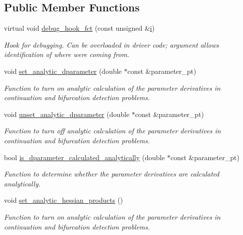 \subsection*{Public Member Functions}
\begin{DoxyCompactItemize}
\item 
virtual void \hyperlink{classoomph_1_1Problem_a36c95c8211cc02558118288888aab5e1}{debug\+\_\+hook\+\_\+fct} (const unsigned \&\hyperlink{cfortran_8h_adb50e893b86b3e55e751a42eab3cba82}{i})
\begin{DoxyCompactList}\small\item\em Hook for debugging. Can be overloaded in driver code; argument allows identification of where we\textquotesingle{}re coming from. \end{DoxyCompactList}\item 
void \hyperlink{classoomph_1_1Problem_aecef49e98bbcede9b8c3137592c2cc5a}{set\+\_\+analytic\+\_\+dparameter} (double $\ast$const \&parameter\+\_\+pt)
\begin{DoxyCompactList}\small\item\em Function to turn on analytic calculation of the parameter derivatives in continuation and bifurcation detection problems. \end{DoxyCompactList}\item 
void \hyperlink{classoomph_1_1Problem_aff7bcab5505ba482a8c9ba7bace68bc0}{unset\+\_\+analytic\+\_\+dparameter} (double $\ast$const \&parameter\+\_\+pt)
\begin{DoxyCompactList}\small\item\em Function to turn off analytic calculation of the parameter derivatives in continuation and bifurcation detection problems. \end{DoxyCompactList}\item 
bool \hyperlink{classoomph_1_1Problem_a41a7b9cf8e6fe1156fc92baa43c3fe4b}{is\+\_\+dparameter\+\_\+calculated\+\_\+analytically} (double $\ast$const \&parameter\+\_\+pt)
\begin{DoxyCompactList}\small\item\em Function to determine whether the parameter derivatives are calculated analytically. \end{DoxyCompactList}\item 
void \hyperlink{classoomph_1_1Problem_a45f64c33501e0f9c65927eefed253eef}{set\+\_\+analytic\+\_\+hessian\+\_\+products} ()
\begin{DoxyCompactList}\small\item\em Function to turn on analytic calculation of the parameter derivatives in continuation and bifurcation detection problems. \end{DoxyCompactList}\item 

\end{DoxyCompactItemize}
